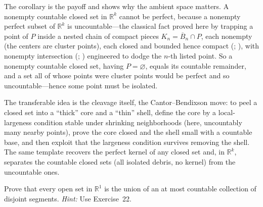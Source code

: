 \documentclass[main.tex]{subfiles}
\begin{document}
\begin{Reflection}
The corollary is the payoff and shows why the ambient space matters. A nonempty countable closed set in
$\mathbb R^k$ cannot be perfect, because a nonempty perfect subset of $\mathbb R^k$ is uncountable---the
classical fact proved here by trapping a point of $P$ inside a nested chain of compact pieces
$K_n=\overline B_n\cap P$, each nonempty (the centers are cluster points), each closed and bounded hence
compact (; ), with nonempty intersection
(; ) engineered to dodge the $n$-th listed point. So
a nonempty countable closed set, having $P=\varnothing$, equals its countable remainder, and a set all of
whose points were cluster points would be perfect and so uncountable---hence some point must be isolated.

The transferable idea is the cleavage itself, the Cantor--Bendixson move: to peel a closed set into a
``thick'' core and a ``thin'' shell, define the core by a local-largeness condition stable under shrinking
neighborhoods (here, uncountably many nearby points), prove the core closed and the shell small with a
countable base, and then exploit that the largeness condition survives removing the shell. The same template
recovers the perfect kernel of any closed set and, in $\mathbb R^k$, separates the countable closed sets
(all isolated debris, no kernel) from the uncountable ones.
\end{Reflection}

Prove that every open set in $\mathbb R^{1}$ is the union of an at most countable collection of disjoint
segments. \emph{Hint:} Use Exercise~22.
\end{document}
